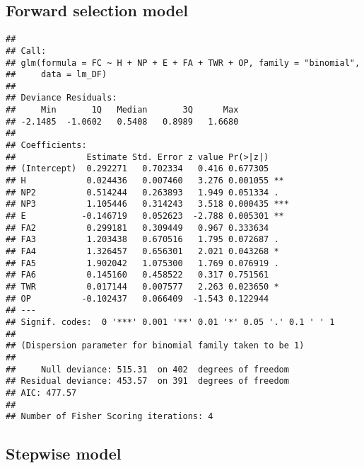 \documentclass[]{article}
\begin{document}
\hypertarget{forward-selection-model-1}{%
\subsection{Forward selection model}\label{forward-selection-model-1}}

\begin{verbatim}
## 
## Call:
## glm(formula = FC ~ H + NP + E + FA + TWR + OP, family = "binomial", 
##     data = lm_DF)
## 
## Deviance Residuals: 
##     Min       1Q   Median       3Q      Max  
## -2.1485  -1.0602   0.5408   0.8989   1.6680  
## 
## Coefficients:
##              Estimate Std. Error z value Pr(>|z|)    
## (Intercept)  0.292271   0.702334   0.416 0.677305    
## H            0.024436   0.007460   3.276 0.001055 ** 
## NP2          0.514244   0.263893   1.949 0.051334 .  
## NP3          1.105446   0.314243   3.518 0.000435 ***
## E           -0.146719   0.052623  -2.788 0.005301 ** 
## FA2          0.299181   0.309449   0.967 0.333634    
## FA3          1.203438   0.670516   1.795 0.072687 .  
## FA4          1.326457   0.656301   2.021 0.043268 *  
## FA5          1.902042   1.075300   1.769 0.076919 .  
## FA6          0.145160   0.458522   0.317 0.751561    
## TWR          0.017144   0.007577   2.263 0.023650 *  
## OP          -0.102437   0.066409  -1.543 0.122944    
## ---
## Signif. codes:  0 '***' 0.001 '**' 0.01 '*' 0.05 '.' 0.1 ' ' 1
## 
## (Dispersion parameter for binomial family taken to be 1)
## 
##     Null deviance: 515.31  on 402  degrees of freedom
## Residual deviance: 453.57  on 391  degrees of freedom
## AIC: 477.57
## 
## Number of Fisher Scoring iterations: 4
\end{verbatim}

\hypertarget{stepwise-model-1}{%
\subsection{Stepwise model}\label{stepwise-model-1}}
\end{document}
